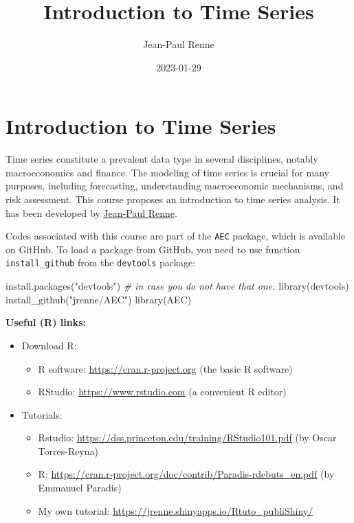 \documentclass[
  12pt,
]{book}
\title{Introduction to Time Series}
\author{Jean-Paul Renne}
\date{2023-01-29}
\newenvironment{Shaded}{\begin{snugshade}}{\end{snugshade}}
\newcommand{\CommentTok}[1]{\textcolor[rgb]{0.56,0.35,0.01}{\textit{#1}}}
\newcommand{\FunctionTok}[1]{\textcolor[rgb]{0.00,0.00,0.00}{#1}}
\newcommand{\NormalTok}[1]{#1}
\newcommand{\StringTok}[1]{\textcolor[rgb]{0.31,0.60,0.02}{#1}}
\providecommand{\tightlist}{%
  \setlength{\itemsep}{0pt}\setlength{\parskip}{0pt}}
\theoremstyle{definition}
\theoremstyle{definition}
\theoremstyle{definition}
\theoremstyle{definition}
\theoremstyle{remark}
\begin{document}
\maketitle

{
\setcounter{tocdepth}{1}
\tableofcontents
}
\newcommand{\bv}[1]{\mathbf{#1}}

\hypertarget{intro}{%
\chapter*{Introduction to Time Series}\label{intro}}

Time series constitute a prevalent data type in several disciplines, notably macroeconomics and finance. The modeling of time series is crucial for many purposes, including forecasting, understanding macroeconomic mechanisms, and risk assessment. This course proposes an introduction to time series analysis. It has been developed by \href{https://sites.google.com/site/jeanpaulrenne/home}{Jean-Paul Renne}.

Codes associated with this course are part of the \texttt{AEC} package, which is available on GitHub. To load a package from GitHub, you need to use function \texttt{install\_github} from the \texttt{devtools} package:

\begin{Shaded}
\begin{Highlighting}[]
\FunctionTok{install.packages}\NormalTok{(}\StringTok{"devtools"}\NormalTok{) }\CommentTok{\# in case you do not have that one.}
\FunctionTok{library}\NormalTok{(devtools)}
\FunctionTok{install\_github}\NormalTok{(}\StringTok{"jrenne/AEC"}\NormalTok{)}
\FunctionTok{library}\NormalTok{(AEC)}
\end{Highlighting}
\end{Shaded}

\textbf{Useful (R) links:}

\begin{itemize}
\item
  Download R:

  \begin{itemize}
  \tightlist
  \item
    R software: \url{https://cran.r-project.org} (the basic R software)
  \item
    RStudio: \url{https://www.rstudio.com} (a convenient R editor)
  \end{itemize}
\item
  Tutorials:

  \begin{itemize}
  \tightlist
  \item
    Rstudio: \url{https://dss.princeton.edu/training/RStudio101.pdf} (by Oscar Torres-Reyna)
  \item
    R: \url{https://cran.r-project.org/doc/contrib/Paradis-rdebuts_en.pdf} (by Emmanuel Paradis)
  \item
    My own tutorial: \url{https://jrenne.shinyapps.io/Rtuto_publiShiny/}
  \end{itemize}
\end{itemize}
\end{document}
